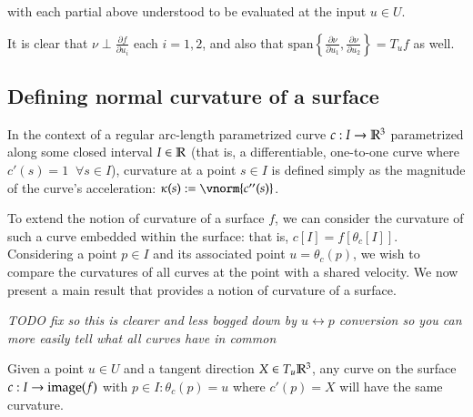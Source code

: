 	  with each partial above understood to be evaluated at the input $u \in U$.
	  
	  It is clear that $\nu \perp \frac{\partial f}{\partial u_i}$ each $i=1,2$, and also that
	  $\textrm{span}\left\{ \frac{\partial \nu}{\partial u_1}, \frac{\partial \nu}{\partial u_2}\right\} = T_u f$ as well.
        \subsection{Defining normal curvature of a surface}
        In the context of a regular arc-length parametrized curve $c: I \to \mathbb{R}^3$ parametrized along some closed interval $I\in \mathbb{R}$
	        (that is, a differentiable, one-to-one curve where $c'(s) = 1 \;\; \forall s \in I$), curvature at a point $s \in I$ is defined simply as the magnitude of the curve's acceleration: $\kappa(s) := \vnorm{c''(s)}$.
	    
	    To extend the notion of curvature of a surface $f$, we can consider the curvature of such a curve embedded within the surface: that is, $c[I] = f[\theta_c[I]]$. Considering a point $p \in I$ and its associated point $u = \theta_c(p)$, we wish to compare the curvatures of all curves at the point with a shared velocity. We now present a main result that provides a notion of curvature of a surface.
		
		\textit{\maltese TODO \color{red} fix so this is clearer and less bogged down by 
			$u \leftrightarrow p$ conversion so you can more easily tell what all curves have in
			common}
		\begin{theorem}
			Given a point $u \in U $ and a tangent direction $X \in T_u \mathbb{R}^3$,
		    any curve on the surface $c: I \to \mathrm{image}(f)$ with $p\in I : \theta_c(p) = u$
		    where $c'(p) = X$ will have the same curvature.
		\end{theorem}
		
